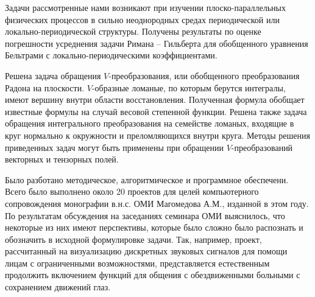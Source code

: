 Задачи рассмотренные нами возникают при изучении плоско-парал\-лельных физических процессов в сильно неоднородных
 средах периодической или локально-периодической структуры.
Получены результаты по оценке погрешности усреднения задачи Римана -- Гильберта для обобщенного уравнения Бельтрами
 с локально-периодическими коэффициентами.



Решена задача обращения $V$-преобразования, или обобщенного преобразования Радона на плоскости. $V$-образные ломаные, по которым берутся интегралы, имеют вершину внутри области восстановления. Полученная формула обобщает известные формулы на случай весовой степенной функции.  Решена также задача обращения интегрального преобразования на семействе ломаных, входящие в круг нормально к окружности и преломляющихся внутри круга.
Методы решения приведенных задач могут быть применены при обращении $V$-преобразований векторных и тензорных полей.



Было разботано методическое, алгоритмическое и программное обеспечени. Всего было выполнено около 20 проектов для целей компьютерного сопровождения монографии в.н.с. ОМИ Магомедова А.М., изданной в этом году. По результатам обсуждения на заседаниях семинара ОМИ выяснилось, что некоторые из них имеют перспективы, которые было сложно было распознать и обозначить в исходной формулировке задачи. Так, например, проект, рассчитанный на визуализацию дискретных звуковых сигналов для помощи лицам с ограниченными возможностями, представляется естественным продолжить включением функций для общения с обездвиженными больными с сохранением движений глаз.



